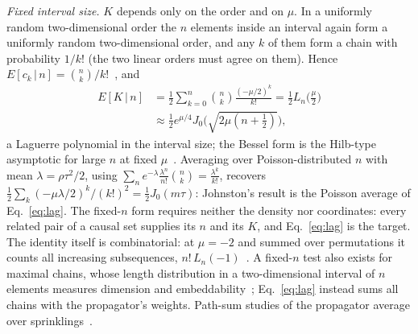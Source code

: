 \documentclass[prd,twocolumn,superscriptaddress,nofootinbib,amsmath,amssymb,floatfix]{revtex4-2}
\begin{document}
\emph{Fixed interval size.} $K$ depends only on the order and on $\mu$. In a uniformly random two-dimensional order the $n$ elements inside an interval again form a uniformly random two-dimensional order, and any $k$ of them form a chain with probability $1/k!$ (the two linear orders must agree on them). Hence $E[c_k\,|\,n]=\binom nk/k!$~\cite{Pinsky06}, and
\begin{equation}
\begin{aligned}
E[K\,|\,n]&=\frac{1}{2}\sum_{k=0}^n\binom nk\frac{(-\mu/2)^k}{k!}=\frac{1}{2}L_n\!\Big(\frac{\mu}{2}\Big)\\
&\approx\frac{1}{2}e^{\mu/4}J_0\Big(\sqrt{2\mu(n+\tfrac12)}\Big),
\end{aligned}
\label{eq:lag}
\end{equation}
a Laguerre polynomial in the interval size; the Bessel form is the Hilb-type asymptotic for large $n$ at fixed $\mu$~\cite{Szego39}. Averaging over Poisson-distributed $n$ with mean $\lambda=\rho\tau^2/2$, using $\sum_ne^{-\lambda}\frac{\lambda^n}{n!}\binom nk=\frac{\lambda^k}{k!}$, recovers $\tfrac12\sum_k(-\mu\lambda/2)^k/(k!)^2=\tfrac12J_0(m\tau)$: Johnston's result is the Poisson average of Eq.~\eqref{eq:lag}. The fixed-$n$ form requires neither the density nor coordinates: every related pair of a causal set supplies its $n$ and its $K$, and Eq.~\eqref{eq:lag} is the target. The identity itself is combinatorial: at $\mu=-2$ and summed over permutations it counts all increasing subsequences, $n!\,L_n(-1)$~\cite{LifschitzPittel81,OEIS}. A fixed-$n$ test also exists for maximal chains, whose length distribution in a two-dimensional interval of $n$ elements measures dimension and embeddability~\cite{ABP18}; Eq.~\eqref{eq:lag} instead sums all chains with the propagator's weights. Path-sum studies of the propagator average over sprinklings~\cite{Shuman23,KastratiHinrichsen26}.
\end{document}

